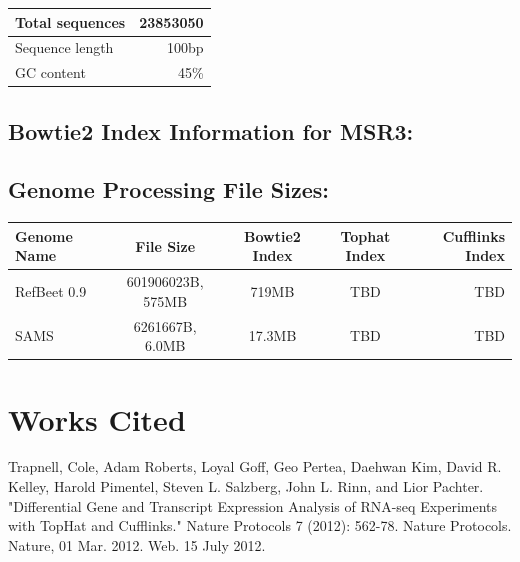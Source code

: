 \documentclass{article}
\begin{document}
	\begin{tabular}{| l | r |}
	\hline
	Total sequences & 23853050 \\ \hline
	Sequence length & 100bp \\ \hline
	GC content & 45\% \\ \hline
	\end{tabular} \linebreak
\newpage
\subsection{Bowtie2 Index Information for MSR3:}

\subsection{Genome Processing File Sizes:}

	\begin{tabular}{| l | c | c | c | r |}
	\hline
	Genome Name & File Size & Bowtie2 Index & Tophat Index & Cufflinks Index\\ \hline
	RefBeet 0.9 & 601906023B, 575MB & 719MB & TBD & TBD \\ \hline
	SAMS & 6261667B, 6.0MB & 17.3MB & TBD & TBD \\ \hline
	\end{tabular}
\newline









\newpage
\section{Works Cited}

Trapnell, Cole, Adam Roberts, Loyal Goff, Geo Pertea, Daehwan Kim, David R. Kelley, Harold Pimentel, Steven L. Salzberg, John L. Rinn, and Lior Pachter. "Differential Gene and Transcript Expression Analysis of RNA-seq Experiments with TopHat and Cufflinks." Nature Protocols 7 (2012): 562-78. Nature Protocols. Nature, 01 Mar. 2012. Web. 15 July 2012.
\end{document}
